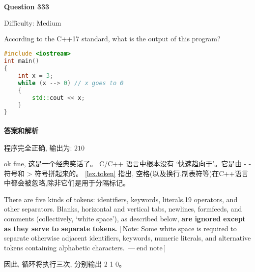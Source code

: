 \documentclass{article}
\begin{document}
	\paragraph*{Question 333} $\boxed{\text{Difficulty: Medium}} $			
	
	According to the C++17 standard, what is the output of this program?
	
	\begin{lstlisting}[language=C++]  		
#include <iostream>
int main()
{
	int x = 3;
	while (x --> 0) // x goes to 0
	{
		std::cout << x; 
	}
}
	\end{lstlisting}
	
	
	\paragraph*{答案和解析} $\boxed{\text{程序完全正确, 输出为: 210}} $
	
	ok fine, 这是一个经典笑话了。 C/C++ 语言中根本没有 `快速趋向于'。它是由 - - 符号和 > 符号拼起来的。
	\href{https://timsong-cpp.github.io/cppwp/n4659/lex.token}{[lex.token]}
	指出, 空格(以及换行,制表符等)在C++语言中都会被忽略,除非它们是用于分隔标记。
	\begin{lightgrayleftbar}
	There are five kinds of tokens: identifiers, keywords, literals,19 operators, and other separators. Blanks, horizontal and vertical tabs, newlines, formfeeds, and comments (collectively, `white space'), as described below, \textbf{are ignored except as they serve to separate tokens.} [ Note: Some white space is required to separate otherwise adjacent identifiers, keywords, numeric literals, and alternative tokens containing alphabetic characters.  — end note ] 
	\end{lightgrayleftbar}
	
	因此, 循环将执行三次, 分别输出 2 1 0。
	
\end{document}
